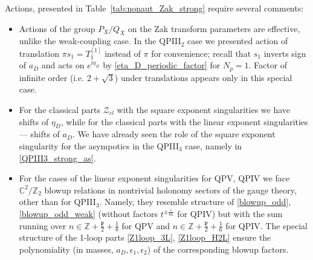 \documentclass[12pt,a4paper]{article}
\numberwithin{equation}{section}
\newcommand{\ri}{\mathrm{i}}
\newcommand{\D}{\scriptscriptstyle{D}}
\begin{document}
Actions, presented in Table~\ref{tab:nonaut_Zak_strong} require several comments:
\begin{itemize}
\item Actions of the group $P_X/Q_X$ on the Zak transform parameters are effective, unlike the weak-coupling case. In the QPIII$_2$ case we presented action of translation $\pi s_1=T_1^{[1]}$ instead of $\pi$ for convenience; recall that $s_1$ inverts sign of $a_{\D}$ and acts on $e^{\ri\eta_{\D}}$ by \eqref{eta_D_periodic_factor} for $N_p=1$. Factor of infinite order (i.e. $2{+}\sqrt3$) under translations appears only in this special case.

\item For the classical parts $\mathcal{Z}_{cl}$ with the square exponent singularities we have shifts of $\eta_{\D}$, while for the classical parts with the linear exponent singularities --- shifts of $a_{\D}$. We have already seen the role of the square exponent singularity for the asympotics in the QPIII$_3$ case, namely in \eqref{QPIII3_strong_as}.

\item For the cases of the linear exponent singularities for QPV, QPIV we face $\mathbb{C}^2/\mathbb{Z}_2$ blowup relations in  nontrivial holonomy sectors of the gauge theory, other than for QPIII$_3$. Namely, they resemble structure of \eqref{blowup_odd}, \eqref{blowup_odd_weak} (without factors $t^{\pm \frac{\epsilon}{8\kappa}}$ for QPIV) but with the sum running over $n\in\mathbb{Z}+\frac{\mathfrak{p}}2+\frac18$ for QPV and $n\in\mathbb{Z}+\frac{\mathfrak{p}}2+\frac16$ for QPIV. The special structure of the 1-loop parts \eqref{Z1loop_3L}, \eqref{Z1loop_H2L} ensure the polynomiality (in masses, $a_{\D},\epsilon_1,\epsilon_2$) of the corresponding blowup factors. 

\end{itemize}
\end{document}
